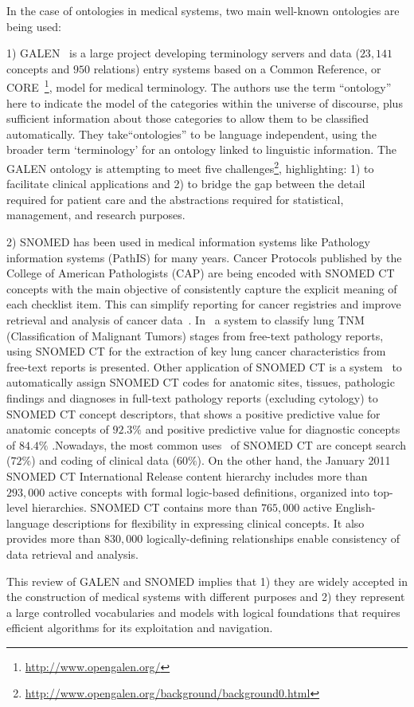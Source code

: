 In the case of ontologies in medical systems, two main well-known ontologies are being used:

1) GALEN~\cite{citeulike:3156699} is a large project developing terminology servers and data ($23,141$ concepts and $950$ relations) 
entry systems based on a Common Reference, or CORE~\footnote{\url{http://www.opengalen.org/}}, model for medical terminology. 
The authors use the term ``ontology'' here to indicate the model of the categories within the universe of discourse, 
plus sufficient information about those categories to allow them to be classified automatically.
They take``ontologies'' to be language independent, using the broader term ‘terminology’ for an ontology
linked to linguistic information. The GALEN ontology is attempting to meet five challenges\footnote{\url{http://www.opengalen.org/background/background0.html}}, highlighting:
1) to facilitate clinical applications and 2) to bridge the gap between the detail required for patient care and the abstractions required for statistical, management, and research purposes.


2) SNOMED has been used in medical information systems like Pathology information systems (PathIS)
for many years. Cancer Protocols published by the College of American Pathologists (CAP) 
are being encoded with SNOMED CT concepts with the main objective of consistently capture 
the explicit meaning of each checklist item. 
This can simplify reporting for cancer registries and improve retrieval 
and analysis of cancer data~\cite{14728542}. In~\cite{citeulike:7749740} a system to classify 
lung TNM (Classification of Malignant Tumors) stages from free-text pathology reports, 
using SNOMED CT for the extraction of  key lung cancer characteristics from free-text reports is presented. 
Other application of SNOMED CT is a system~\cite{20351885} to automatically assign SNOMED CT codes for anatomic sites, 
tissues, pathologic findings and diagnoses in full-text pathology reports (excluding cytology) 
to SNOMED CT concept descriptors, that shows a positive predictive value for anatomic 
concepts of $92.3\%$ and positive predictive value for diagnostic concepts of $84.4\%$ .Nowadays, 
the most common uses~\cite{21346970} of SNOMED CT are concept search ($72\%$) and coding of clinical data ($60\%$).
On the other hand, the January 2011 SNOMED CT International Release content hierarchy 
includes more than $293,000$ active concepts with formal logic-based definitions, 
organized into top-level hierarchies. SNOMED CT contains more than $765,000$ active 
English-language descriptions for flexibility in expressing clinical concepts. It also provides more 
than $830,000$ logically-defining relationships enable consistency of data retrieval and analysis. 

This review of GALEN and SNOMED implies that 1) they are widely accepted in the construction of medical systems with different
purposes and 2) they represent a large controlled vocabularies and models with logical foundations that requires
efficient algorithms for its exploitation and navigation.




